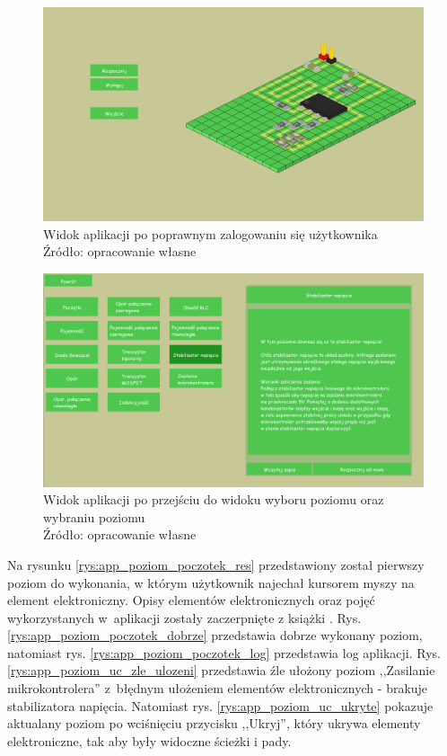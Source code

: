 \documentclass[12pt, a4paper]{article} %
\begin{document}
\begin{figure}[h]
	\centering
	\includegraphics[width=15cm]{images/uruchomienie/app_start_menu_logged.png}
	\caption{Widok aplikacji po poprawnym zalogowaniu się użytkownika \\ Źródło: opracowanie własne}
	\label{rys:start_menu_logged}
\end{figure} 

\begin{figure}[h]
	\centering
	\includegraphics[width=15cm]{images/uruchomienie/app_select_level.png}
	\caption{Widok aplikacji po przejściu do widoku wyboru poziomu oraz wybraniu poziomu \\ Źródło: opracowanie własne}
	\label{rys:select_level}
\end{figure} 


\aka Na rysunku \ref{rys:app_poziom_poczotek_res} przedstawiony został pierwszy poziom do wykonania, w którym użytkownik najechał kursorem myszy na element elektroniczny. Opisy elementów elektronicznych oraz pojęć wykorzystanych w~aplikacji zostały zaczerpnięte z książki \cite{ele}.  Rys. \ref{rys:app_poziom_poczotek_dobrze} przedstawia dobrze wykonany poziom, natomiast rys. \ref{rys:app_poziom_poczotek_log} przedstawia log aplikacji. Rys. \ref{rys:app_poziom_uc_zle_ulozeni} przedstawia źle ułożony poziom ,,Zasilanie mikrokontrolera'' z~błędnym ułożeniem elementów elektronicznych - brakuje stabilizatora napięcia. Natomiast rys. \ref{rys:app_poziom_uc_ukryte} pokazuje aktualany poziom po wciśnięciu przycisku ,,Ukryj'', który ukrywa elementy elektroniczne, tak aby były widoczne ścieżki i pady.
\end{document}
